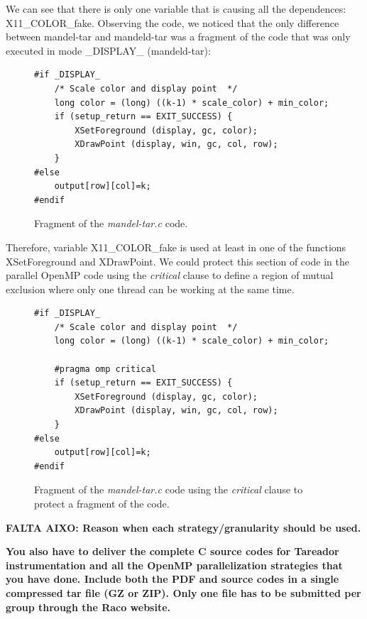 \documentclass[12pt, a4paper]{article}
\begin{document}
We can see that there is only one variable that is causing all the dependences: X11\_COLOR\_fake. Observing the code, we noticed that the only difference between mandel-tar and mandeld-tar was a fragment of the code that was only executed in mode \_DISPLAY\_ (mandeld-tar):

\begin{figure}[H]
\begin{lstlisting}
#if _DISPLAY_
    /* Scale color and display point  */
    long color = (long) ((k-1) * scale_color) + min_color;
    if (setup_return == EXIT_SUCCESS) {
        XSetForeground (display, gc, color);
        XDrawPoint (display, win, gc, col, row);
    }
#else
    output[row][col]=k;
#endif
\end{lstlisting}
\caption{Fragment of the \textit{mandel-tar.c} code.}
\label{fig:display_code}
\end{figure}

Therefore, variable X11\_COLOR\_fake is used at least in one of the functions XSetForeground and XDrawPoint. We could protect this section of code in the parallel OpenMP code using the \textit{critical} clause to define a region of mutual exclusion where only one thread can be working at the same time.

\begin{figure}[H]
\begin{lstlisting}
#if _DISPLAY_
    /* Scale color and display point  */
    long color = (long) ((k-1) * scale_color) + min_color;
    
    #pragma omp critical
    if (setup_return == EXIT_SUCCESS) {
        XSetForeground (display, gc, color);
        XDrawPoint (display, win, gc, col, row);
    }
#else
    output[row][col]=k;
#endif
\end{lstlisting}
\caption{Fragment of the \textit{mandel-tar.c} code using the \textit{critical} clause to protect a fragment of the code.}
\label{fig:display_code}
\end{figure}



\textbf{\large\large{{FALTA AIXO:  Reason when each strategy/granularity should be used.}}}

\textbf{\large\large{{You also have to deliver the complete C source codes for Tareador instrumentation and all the
OpenMP parallelization strategies that you have done. Include both the PDF and source codes in
a single compressed tar file (GZ or ZIP). Only one file has to be submitted per group through the
Raco website.}}}
\end{document}
